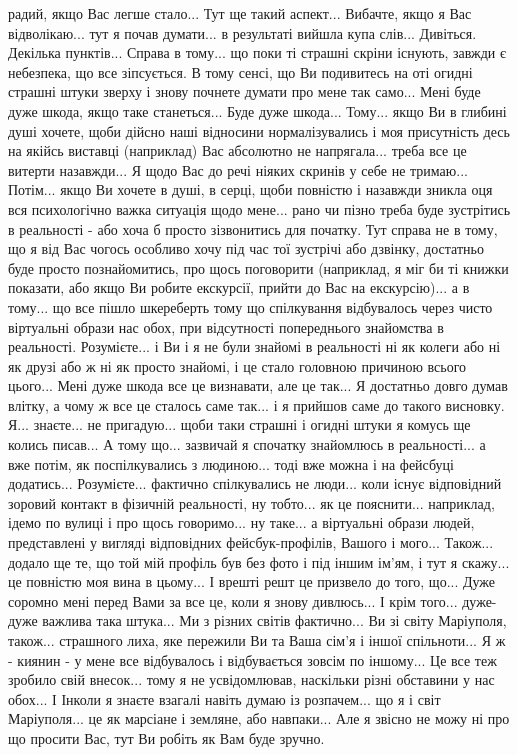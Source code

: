 радий, якщо Вас легше стало... Тут ще такий аспект... Вибачте, якщо я Вас
відволікаю... тут я почав думати... в результаті вийшла купа слів... Дивіться.
Декілька пунктів... Справа в тому... що поки ті страшні скріни існують, завжди
є небезпека, що все зіпсується. В тому сенсі, що Ви подивитесь на оті огидні
страшні штуки зверху і знову почнете думати про мене так само... Мені буде дуже
шкода, якщо таке станеться... Буде дуже шкода... Тому... якщо Ви в глибині душі
хочете, щоби дійсно наші відносини нормалізувались і моя присутність десь на
якійсь виставці (наприклад) Вас абсолютно не напрягала... треба все це витерти
назавжди... Я щодо Вас до речі ніяких скринів у себе не тримаю... Потім... якщо
Ви хочете в душі, в серці, щоби повністю і назавжди зникла оця вся психологічно
важка ситуація щодо мене...  рано чи пізно треба буде зустрітись в реальності -
або хоча б просто зізвонитись для початку. Тут справа не в тому, що я від Вас
чогось особливо хочу під час тої зустрічі або дзвінку, достатньо буде просто
познайомитись, про щось поговорити (наприклад, я міг би ті книжки показати,
або якщо Ви робите екскурсії, прийти до Вас на екскурсію)... а в тому... що все
пішло шкереберть тому що спілкування відбувалось через чисто віртуальні образи
нас обох, при відсутності попереднього знайомства в реальності. Розумієте... і
Ви і я не були знайомі в реальності ні як колеги або ні як друзі або ж ні як
просто знайомі, і це стало головною причиною всього цього... Мені дуже шкода
все це визнавати, але це так... Я достатньо довго думав влітку, а чому ж все це
сталось саме так...  і я прийшов саме до такого висновку. Я... знаєте... не
пригадую... щоби таки страшні і огидні штуки я комусь ще колись писав... А тому
що... зазвичай я спочатку знайомлюсь в реальності... а вже потім, як
поспілкувались з людиною... тоді вже можна і на фейсбуці додатись...
Розумієте... фактично спілкувались не люди... коли існує відповідний зоровий
контакт в фізичній реальності, ну тобто... як це пояснити... наприклад, ідемо
по вулиці і про щось говоримо... ну таке... а віртуальні образи людей,
представлені у вигляді відповідних фейсбук-профілів, Вашого і мого... Також...
додало ще те, що той мій профіль був без фото і під іншим ім'ям, і тут я
скажу... це повністю моя вина в цьому... І врешті решт це призвело до того,
що... Дуже соромно мені перед Вами за все це, коли я знову дивлюсь... І крім
того... дуже-дуже важлива така штука... Ми з різних світів фактично... Ви зі
світу Маріуполя, також... страшного лиха, яке пережили Ви та Ваша сім'я і іншої
спільноти... Я ж - киянин - у мене все відбувалось і відбувається зовсім по
іншому... Це все теж зробило свій внесок... тому я не усвідомлював, наскільки
різні обставини у нас обох... І Інколи я знаєте взагалі навіть думаю із
розпачем... що я і світ Маріуполя... це як марсіане і земляне, або навпаки...
Але я звісно не можу ні про що просити Вас, тут Ви робіть як Вам буде зручно.
